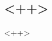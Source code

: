 \documentclass[paper=a4,fontsize=14pt]{scrreprt}
\begin{document}
\pagestyle{Aplain} %
\color{soYellow}
\renewcommand\footnoterule{\color{soWhite} \kern-3pt \hrule width 0.4\columnwidth \kern 2.6pt}


\begin{spacing}{1}
	\section{<++>}
\end{spacing}
<++>
\end{document}

